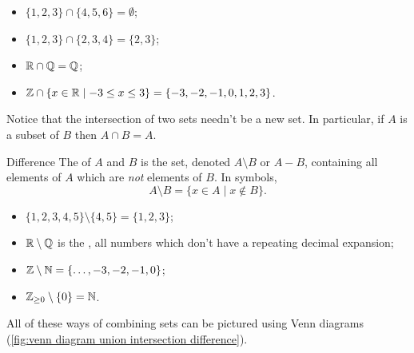 \documentclass[fleqn]{LectureClass/LectureClass}
\begin{document}
    \begin{exm}{}{}
        \begin{itemize}
            \item \(\{1, 2, 3\} \cap \{4, 5, 6\} = \emptyset\);
            \item \(\{1, 2, 3\} \cap \{2, 3, 4\} = \{2, 3\}\);
            \item \(\mathbb{R} \cap \mathbb{Q} = \mathbb{Q}\);
            \item \(\mathbb{Z} \cap \{x \in \mathbb{R} \mid -3 \le x \le 3\} = \{-3, -2, -1, 0, 1, 2, 3\}\).
        \end{itemize}
    \end{exm}
    
    Notice that the intersection of two sets needn't be a new set.
    In particular, if \(A\) is a subset of \(B\) then \(A \cap B = A\).
    
    \begin{dfn}{Difference}{}
        The  of \(A\) and \(B\) is the set, denoted \(A \setminus B\) or \(A - B\), containing all elements of \(A\) which are \emph{not} elements of \(B\).
        In symbols,
        \begin{equation}
            A \setminus B = \{x \in A \mid x \notin B\}.
        \end{equation}
    \end{dfn}
    
    \begin{exm}{}{}
        \begin{itemize}
            \item \(\{1, 2, 3, 4, 5\} \setminus \{4, 5\} = \{1, 2, 3\}\);
            \item \(\mathbb{R} \setminus \mathbb{Q}\) is the , all numbers which don't have a repeating decimal expansion;
            \item \(\mathbb{Z} \setminus \mathbb{N} = \{\dotsc, -3, -2, -1, 0\}\);
            \item \(\mathbb{Z}_{\ge 0} \setminus \{0\} = \mathbb{N}\).
        \end{itemize}
    \end{exm}
    
    All of these ways of combining sets can be pictured using Venn diagrams (\cref{fig:venn diagram union intersection difference}).
    
\end{document}
